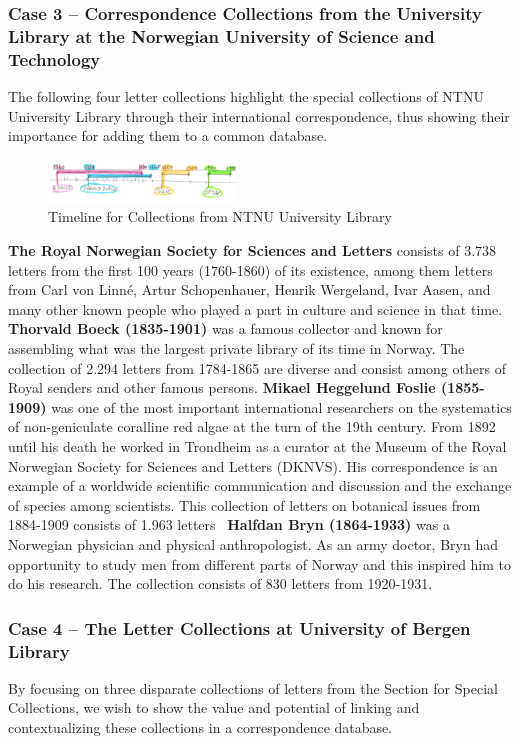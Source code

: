 \documentclass[runningheads]{llncs}
\begin{document}
\subsubsection{Case 3 -- Correspondence Collections from the University Library at the Norwegian University of Science and Technology}
The following four letter collections highlight the special collections
of NTNU University Library through their international correspondence,
thus showing their importance for adding them to a common database.

\begin{figure}[h!]
\centering
\includegraphics[width=50mm]{NTNU_case_sketch.png}
\caption{Timeline for Collections from NTNU University Library} \label{fig6}
\end{figure}

\textbf{The Royal Norwegian Society for Sciences and Letters} consists of 3.738 letters from the first 100 years (1760-1860) of its existence, among them letters from Carl von Linné, Artur Schopenhauer, Henrik Wergeland, Ivar Aasen, and many other known people who played a part in culture and science in that time.
\textbf{Thorvald Boeck (1835-1901)} was a famous collector and known for assembling what was the largest private library of its time in Norway. The collection of 2.294 letters from 1784-1865 are diverse and consist among others of Royal senders and other famous persons. 
\textbf{Mikael Heggelund Foslie (1855-1909)} was one of the most important international researchers on the systematics of non-geniculate coralline red algae at the turn of the 19th century. From 1892 until his death he worked in Trondheim as a curator at the Museum of the Royal Norwegian Society for Sciences and Letters (DKNVS). His correspondence is an example of a worldwide scientific communication and discussion and the exchange of species among scientists. This  collection of letters on botanical issues from 1884-1909 consists of 1.963 letters~\cite{ref_algae}
\textbf{Halfdan Bryn (1864-1933)} was a Norwegian physician and physical anthropologist. As an army doctor, Bryn had opportunity to study men from different parts of Norway and this inspired him to do his research. The collection consists of 830 letters from 1920-1931.~\cite{ref_halfdan}

\subsubsection{Case 4 -- The Letter Collections at University of Bergen Library}
By focusing on three disparate collections of letters from the Section
for Special Collections, we wish to show the value and potential of
linking and contextualizing these collections in a correspondence
database.
\end{document}
